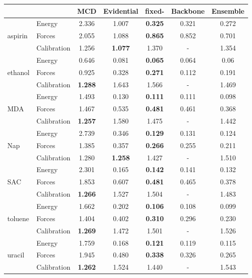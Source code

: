 \begin{tabular}{llccc||c|c}
\toprule
{} & & MCD & Evidential & fixed-\oursacro{} & Backbone & Ensemble \\
\midrule
\multirow{3}{*}{aspirin} & Energy & 2.336 & 1.007 & \textbf{0.325} & 0.321 & 0.272\\ & Forces & 2.055 & 1.088 & \textbf{0.865} & 0.852 & 0.701\\ & Calibration & 1.256 & \textbf{1.077} & 1.370 & - & 1.354\\
\hline
\multirow{3}{*}{ethanol} & Energy & 0.646 & 0.081 & \textbf{0.065} & 0.064 & 0.06\\ & Forces & 0.925 & 0.328 & \textbf{0.271} & 0.112 & 0.191\\ & Calibration & \textbf{1.288} & 1.643 & 1.566 & - & 1.469\\
\hline
\multirow{3}{*}{MDA} & Energy & 1.493 & 0.130 & \textbf{0.111} & 0.111 & 0.098\\ & Forces & 1.467 & 0.535 & \textbf{0.481} & 0.461 & 0.368\\ & Calibration & \textbf{1.257} & 1.580 & 1.475 & - & 1.442\\
\hline
\multirow{3}{*}{Nap} & Energy & 2.739 & 0.346 & \textbf{0.129} & 0.131 & 0.124\\ & Forces & 1.385 & 0.357 & \textbf{0.266} & 0.255 & 0.211\\ & Calibration & 1.280 & \textbf{1.258} & 1.427 & - & 1.510\\
\hline
\multirow{3}{*}{SAC} & Energy & 2.301 & 0.165 & \textbf{0.142} & 0.141 & 0.132\\ & Forces & 1.853 & 0.607  & \textbf{0.481} & 0.465 & 0.378\\ & Calibration & \textbf{1.266} & 1.527 & 1.504 & - & 1.483\\
\hline
\multirow{3}{*}{toluene} & Energy & 1.662 & 0.202 & \textbf{0.106} & 0.108 & 0.099\\ & Forces & 1.404 & 0.402 & \textbf{0.310} & 0.296 & 0.230\\ & Calibration & \textbf{1.269} & 1.472 & 1.501 & - & 1.526\\
\hline
\multirow{3}{*}{uracil} & Energy & 1.759 & 0.168 & \textbf{0.121} & 0.119 & 0.115\\ & Forces & 1.945 & 0.480 & \textbf{0.338} & 0.326 & 0.265\\ & Calibration & \textbf{1.262} & 1.524 & 1.440 & - & 1.543\\
\bottomrule
\end{tabular}